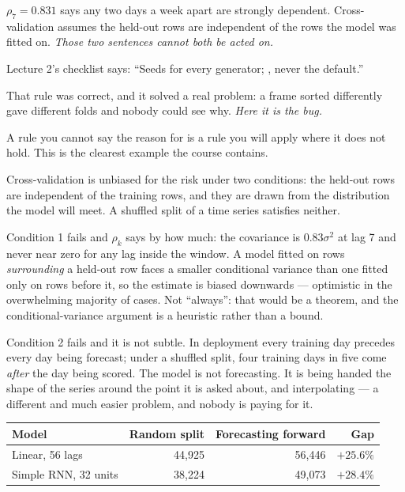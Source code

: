\documentclass[11pt,a4paper]{article}
\begin{document}
$\rho_7 = 0.831$ says any two days a week apart are strongly dependent.
Cross-validation assumes the held-out rows are independent of the rows the
model was fitted on. \emph{Those two sentences cannot both be acted on.}

\begin{failbox}[title={Failure condition --- a rule applied where its reason does not hold}]
Lecture 2's checklist says: ``Seeds for every generator;
, never the default.''

That rule was correct, and it solved a real problem: a frame sorted differently
gave different folds and nobody could see why. \emph{Here it is the bug.}

A rule you cannot say the reason for is a rule you will apply where it does not
hold. This is the clearest example the course contains.
\end{failbox}

Cross-validation is unbiased for the risk under two conditions: the held-out
rows are independent of the training rows, and they are drawn from the
distribution the model will meet. A shuffled split of a time series satisfies
neither.

Condition 1 fails and $\rho_k$ says by how much: the covariance is
$0.83\sigma^2$ at lag 7 and never near zero for any lag inside the window. A
model fitted on rows \emph{surrounding} a held-out row faces a smaller
conditional variance than one fitted only on rows before it, so the estimate is
biased downwards --- optimistic in the overwhelming majority of cases. Not
``always'': that would be a theorem, and the conditional-variance argument is a
heuristic rather than a bound.

Condition 2 fails and it is not subtle. In deployment every training day
precedes every day being forecast; under a shuffled split, four training days
in five come \emph{after} the day being scored. The model is not forecasting.
It is being handed the shape of the series around the point it is asked about,
and interpolating --- a different and much easier problem, and nobody is paying
for it.

\begin{center}
\small
\begin{tabular}{lrrr}
\toprule
\textbf{Model} & \textbf{Random split} & \textbf{Forecasting forward} &
\textbf{Gap} \\
\midrule
Linear, 56 lags & 44{,}925 & 56{,}446 & $+25.6\%$ \\
Simple RNN, 32 units & 38{,}224 & 49{,}073 & $+28.4\%$ \\
\bottomrule
\end{tabular}
\end{center}
\end{document}
